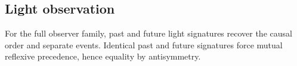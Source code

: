 \subsection{Light observation}

\begin{theorem}\label{thm:light-observation}\leanok{}
For the full observer family, past and future light signatures recover the
causal order and separate events. Identical past and future signatures force
mutual reflexive precedence, hence equality by antisymmetry.
\end{theorem}
